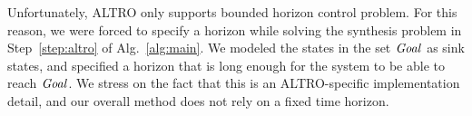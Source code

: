 
\begin{remark}
	Unfortunately, ALTRO only supports bounded horizon control problem.
	For this reason, we were forced to specify a horizon while solving the synthesis problem in Step~\ref{step:altro} of Alg.~\ref{alg:main}.
	We modeled the states in the set $\mathit{Goal}$ as sink states, and specified a horizon that is long enough for the system to be able to reach $\mathit{Goal}$.
	We stress on the fact that this is an ALTRO-specific implementation detail, and our overall method does not rely on a fixed time horizon.
\end{remark}

